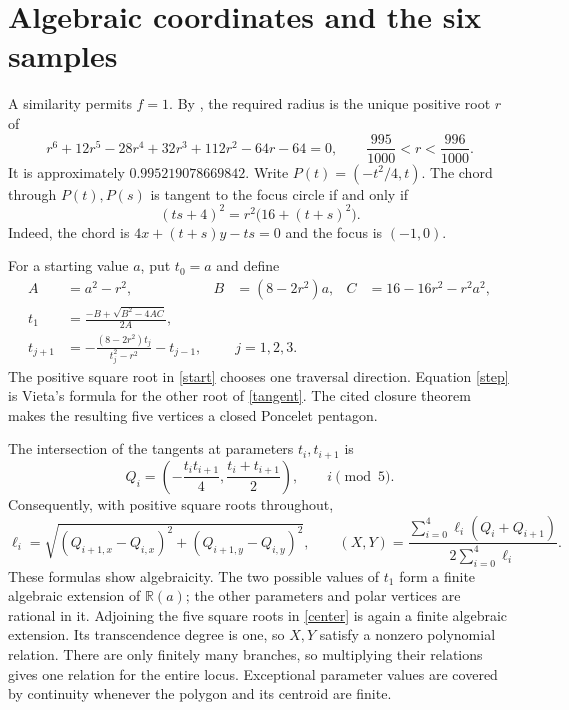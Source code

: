 \documentclass[11pt]{article}
\begin{document}
\section*{Algebraic coordinates and the six samples}
A similarity permits $f=1$. By \cite[Proposition 25]{BGR}, the
required radius is the unique positive root $r$ of
\begin{equation}\label{radius}
 r^6+12r^5-28r^4+32r^3+112r^2-64r-64=0,
 \qquad \frac{995}{1000}<r<\frac{996}{1000}.
\end{equation}
It is approximately $0.995219078669842$. Write
$P(t)=(-t^2/4,t)$. The chord through $P(t),P(s)$ is tangent to the
focus circle if and only if
\begin{equation}\label{tangent}
 (ts+4)^2=r^2\bigl(16+(t+s)^2\bigr).
\end{equation}
Indeed, the chord is $4x+(t+s)y-ts=0$ and the focus is $(-1,0)$.

For a starting value $a$, put $t_0=a$ and define
\begin{align}
 A&=a^2-r^2,& B&=(8-2r^2)a,& C&=16-16r^2-r^2a^2,\nonumber\\
 t_1&=\frac{-B+\sqrt{B^2-4AC}}{2A},\label{start}\\
 t_{j+1}&=-\frac{(8-2r^2)t_j}{t_j^2-r^2}-t_{j-1},
       &&j=1,2,3.\label{step}
\end{align}
The positive square root in \eqref{start} chooses one traversal
direction. Equation \eqref{step} is Vieta's formula for the other
root of \eqref{tangent}. The cited closure theorem makes the
resulting five vertices a closed Poncelet pentagon.

The intersection of the tangents at parameters $t_i,t_{i+1}$ is
\begin{equation}\label{polar}
 Q_i=\left(-\frac{t_it_{i+1}}4,\frac{t_i+t_{i+1}}2\right),
 \qquad i\pmod5 .
\end{equation}
Consequently, with positive square roots throughout,
\begin{equation}\label{center}
 \ell_i=\sqrt{(Q_{i+1,x}-Q_{i,x})^2+
                    (Q_{i+1,y}-Q_{i,y})^2},\qquad
 (X,Y)=\frac{\sum_{i=0}^4\ell_i(Q_i+Q_{i+1})}
                    {2\sum_{i=0}^4\ell_i}.
\end{equation}
These formulas show algebraicity. The two possible values of
$t_1$ form a finite algebraic extension of $\mathbb R(a)$;
the other parameters and polar vertices are rational in it.
Adjoining the five square roots in \eqref{center} is again a
finite algebraic extension. Its transcendence degree is one, so
$X,Y$ satisfy a nonzero polynomial relation. There are only finitely
many branches, so multiplying their relations gives one relation
for the entire locus. Exceptional parameter values are covered by
continuity whenever the polygon and its centroid are finite.
\end{document}
